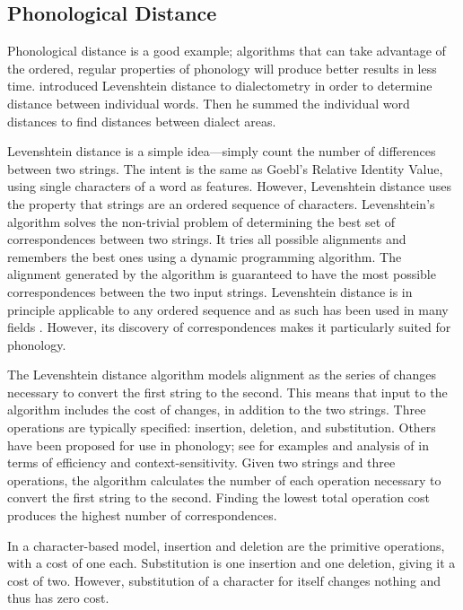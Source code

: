 \documentclass[11pt]{article}
\begin{document}
\subsection{Phonological Distance}

Phonological distance is a good example; algorithms that can take
advantage of the ordered, regular properties of phonology will produce
better results in less time.  introduced
Levenshtein distance \cite{lev65} to dialectometry in order to
determine distance between individual words. Then he summed the
individual word distances to find distances between dialect areas.

Levenshtein distance is a simple idea---simply count the
number of differences between two strings. The intent is the same as
Goebl's Relative Identity Value, using single characters of a word as
features. However, Levenshtein distance uses the property that strings
are an ordered sequence of characters. Levenshtein's algorithm solves
the non-trivial problem of determining the best set of correspondences
between two strings. It tries all possible alignments and
remembers the best ones using a dynamic programming algorithm. The
alignment generated by the algorithm is guaranteed to have the most
possible correspondences between the two input strings.
Levenshtein distance is in principle applicable to any
ordered sequence and as such has been used in many fields
\cite{sankoff83}. However, its discovery of correspondences makes it
particularly suited for phonology.

The Levenshtein distance algorithm models alignment as the series of
changes necessary to convert the first string to the second. This
means that input to the algorithm includes the cost of changes, in
addition to the two strings. Three operations are typically
specified: insertion, deletion, and substitution. Others have been
proposed for use in phonology; see \cite{kondrak02} for examples and
analysis of in terms of efficiency and context-sensitivity. Given two
strings and three operations, the algorithm calculates the number of
each operation necessary to convert the first string to the
second. Finding the lowest total operation cost produces the highest
number of correspondences.

In a character-based model, insertion and deletion are the primitive operations,
with a cost of one each. Substitution is one insertion and one
deletion, giving it a cost of two. However, substitution of a character
for itself changes nothing and thus has zero cost.
\end{document}
